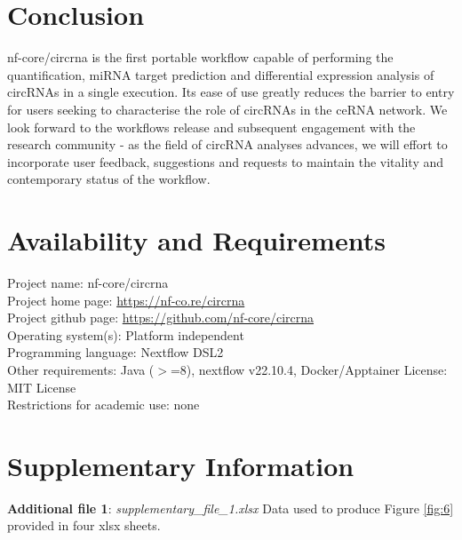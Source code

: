 \documentclass{bmcart}
\begin{document}
\section*{Conclusion}
nf-core/circrna is the first portable workflow capable of performing the quantification, miRNA target prediction and differential expression analysis of circRNAs in a single execution. Its ease of use greatly reduces the barrier to entry for users seeking to characterise the role of circRNAs in the ceRNA network. We look forward to the workflows release and subsequent engagement with the research community - as the field of circRNA analyses advances, we will effort to incorporate user feedback, suggestions and requests to maintain the vitality and contemporary status of the workflow. 


\section*{Availability and Requirements}
\vspace{0.25cm}
\begin{addmargin}[2.5em]{2.5em}
Project name: nf-core/circrna \\
Project home page: \href{https://nf-co.re/circrna}{https://nf-co.re/circrna} \\
Project github page: \href{https://github.com/nf-core/circrna}{https://github.com/nf-core/circrna} \\
Operating system(s): Platform independent \\
Programming language: Nextflow DSL2\\
Other requirements: Java ($>$=8), nextflow v22.10.4, Docker/Apptainer
License: MIT License \\
Restrictions for academic use: none 
\end{addmargin}

\section*{Supplementary Information}
\textbf{Additional file 1}: \textit{supplementary\_file\_1.xlsx} Data used to produce Figure \ref{fig:6} provided in four xlsx sheets.

\end{document}
